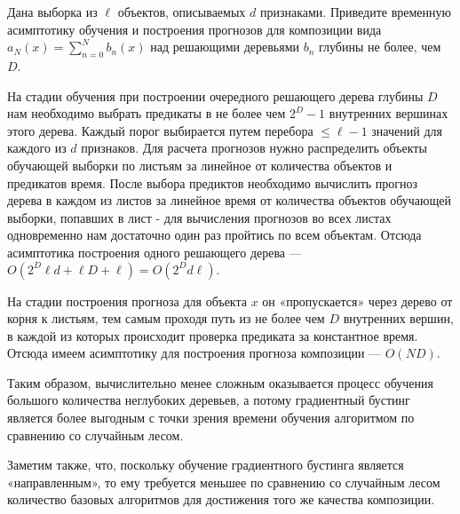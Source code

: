 \documentclass[12pt,fleqn]{article}
\begin{document}
\begin{vkProblem}
Дана выборка из $\ell$ объектов, описываемых $d$ признаками. Приведите временную асимптотику обучения и построения прогнозов для композиции вида $a_N(x) = \sum_{n=0}^N b_n(x)$ над решающими деревьями $b_n$ глубины не более, чем $D$.
\end{vkProblem}
\begin{esSolution} 
На стадии обучения при построении очередного решающего дерева глубины $D$ нам необходимо выбрать предикаты в не более чем $2^D - 1$ внутренних вершинах этого дерева. Каждый порог выбирается путем перебора $\le \ell - 1$ значений  для каждого из $d$ признаков. Для расчета прогнозов нужно распределить объекты обучающей выборки по листьям за линейное от количества объектов и предикатов время. После выбора предиктов необходимо вычислить прогноз дерева в каждом из листов за линейное время от количества объектов обучающей выборки, попавших в лист - для вычисления прогнозов во всех листах одновременно нам достаточно один раз пройтись по всем объектам. Отсюда асимптотика построения одного решающего дерева — $O(2^D \ell d + \ell D + \ell) = O(2^Dd \ell ).$

На стадии построения прогноза для объекта $x$ он «пропускается» через дерево от корня к листьям, тем самым проходя путь из не более чем $D$ внутренних вершин, в каждой из которых происходит проверка предиката за константное время. Отсюда имеем асимптотику для построения прогноза композиции — $O(ND)$.

\end{esSolution}

Таким образом, вычислительно менее сложным оказывается процесс обучения большого количества неглубоких деревьев, а потому градиентный бустинг является более выгодным с точки зрения времени обучения алгоритмом по сравнению со случайным лесом.

Заметим также, что, поскольку обучение градиентного бустинга является «направленным», то ему требуется меньшее по сравнению со случайным лесом количество базовых алгоритмов для достижения того же качества композиции.
\end{document}
